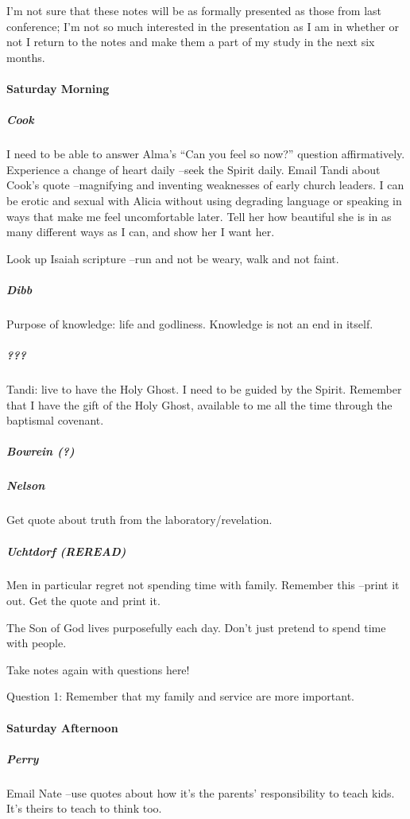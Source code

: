 I'm not sure that these notes will be as formally presented as those from last conference; I'm not so much interested in the presentation as I am in whether or not I return to the notes and make them a part of my study in the next six months.

\paragraph*{Saturday Morning}

\subparagraph*{Cook} I need to be able to answer Alma's ``Can you feel so now?'' question affirmatively. Experience a change of heart daily --seek the Spirit daily. Email Tandi about Cook's quote --magnifying and inventing weaknesses of early church leaders. I can be erotic and sexual with Alicia without using degrading language or speaking in ways that make me feel uncomfortable later. Tell her how beautiful she is in as many different ways as I can, and show her I want her.

Look up Isaiah scripture --run and not be weary, walk and not faint.

\subparagraph*{Dibb} Purpose of knowledge: life and godliness. Knowledge is not an end in itself.

\subparagraph*{???} Tandi: live to have the Holy Ghost. I need to be guided by the Spirit. Remember that I have the gift of the Holy Ghost, available to me all the time through the baptismal covenant.

\subparagraph*{Bowrein (?)}

\subparagraph*{Nelson} Get quote about truth from the laboratory/revelation.

\subparagraph*{Uchtdorf (REREAD)} Men in particular regret not spending time with family. Remember this --print it out. Get the quote and print it.

The Son of God lives purposefully each day. Don't just pretend to spend time with people.

Take notes again with questions here!

Question 1: Remember that my family and service are more important.

\paragraph*{Saturday Afternoon}

\subparagraph*{Perry} Email Nate --use quotes about how it's the parents' responsibility to teach kids. It's theirs to teach to think too.

